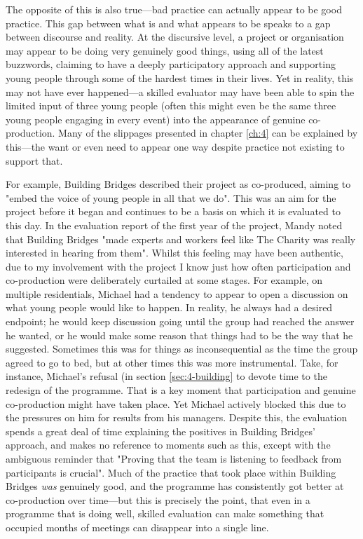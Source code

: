 The opposite of this is also true—bad practice can actually appear to be good practice. This gap between what is and what appears to be speaks to a gap between discourse and reality. At the discursive level, a project or organisation may appear to be doing very genuinely good things, using all of the latest buzzwords, claiming to have a deeply participatory approach and supporting young people through some of the hardest times in their lives. Yet in reality, this may not have ever happened—a skilled evaluator may have been able to spin the limited input of three young people (often this might even be the same three young people engaging in every event) into the appearance of genuine co-production. Many of the slippages presented in chapter \ref{ch:4} can be explained by this—the want or even need to appear one way despite  practice not existing to support that.

For example, Building Bridges described their project as co-produced, aiming to "embed the voice of young people in all that we do". This was an aim for the project before it began and continues to be a basis on which it is evaluated to this day. In the evaluation report of the first year of the project, Mandy noted that Building Bridges "made experts and workers feel like The Charity was really interested in hearing from them". Whilst this feeling may have been authentic, due to my involvement with the project I know just how often participation and co-production were deliberately curtailed at some stages. For example, on multiple residentials, Michael had a tendency to appear to open a discussion on what young people would like to happen. In reality, he always had a desired endpoint; he would keep discussion going until the group had reached the answer he wanted, or  he would make some reason that things had to be the way that he suggested. Sometimes this was for things as inconsequential as the time the group agreed to go to bed, but at other times this was more instrumental. Take, for instance, Michael's refusal (in section \ref{sec:4-building} to devote time to the redesign of the programme. That is a key moment that participation and genuine co-production might have taken place. Yet Michael actively blocked this due to the pressures on him for results from his managers. Despite this, the evaluation spends a great deal of time explaining the positives in Building Bridges' approach, and makes no reference to moments such as this, except with the ambiguous reminder that "Proving that the team is listening to feedback from participants is crucial". Much of the practice that took place within Building Bridges \emph{was} genuinely good, and the programme has consistently got better at co-production over time—but this is precisely the point, that even in a programme that is doing well, skilled evaluation can make something that occupied months of meetings can disappear into a single line.

